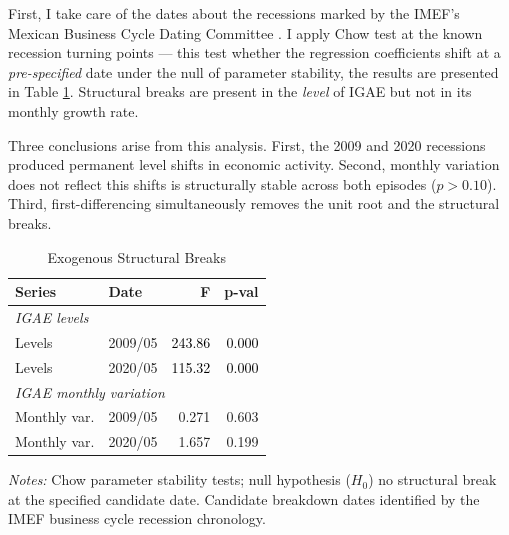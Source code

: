 \documentclass[12pt]{article}
\begin{document}
First, I take care of the dates about the recessions marked by the IMEF's Mexican Business Cycle Dating Committee \citep{comite2025}. I apply Chow test at the known recession turning points --- this test whether the regression coefficients shift at a \textit{pre-specified }date under the null of parameter stability, the results are presented in Table \ref{tab:exog}. Structural breaks are present in the \textit{level} of IGAE but not in its monthly growth rate.

Three conclusions arise from this analysis. First, the 2009 and 2020 recessions produced permanent level shifts in economic activity. Second, monthly variation does not reflect this shifts is structurally stable across both episodes ($p > 0.10$). Third, first-differencing simultaneously removes the unit root and the structural breaks.


\begin{table}[H]
\centering
\begin{threeparttable}
\caption{Exogenous Structural Breaks}\label{tab:exog}
\begin{tabular}{llrr}
\hline
\textbf{Series} & \textbf{Date} & \textbf{F} & \textbf{p-val} \\
\hline
\multicolumn{4}{l}{\textit{IGAE levels}} \\
\hline
Levels & 2009/05 & \textcolor{black}{243.86} & \textcolor{black}{0.000} \\
Levels & 2020/05 & \textcolor{black}{115.32} & \textcolor{black}{0.000} \\
\hline
\multicolumn{4}{l}{\textit{IGAE monthly variation}} \\
\hline
Monthly var. & 2009/05 & 0.271 & 0.603 \\
Monthly var. & 2020/05 & 1.657 & 0.199 \\
\hline
\end{tabular}
\begin{tablenotes}
    \small
    \item \textit{Notes:} Chow parameter stability tests;  null hypothesis ($H_0$) no structural break at the specified candidate date. Candidate breakdown dates identified by the IMEF business cycle recession chronology. %
\end{tablenotes}
\end{threeparttable}
\end{table}
\end{document}
